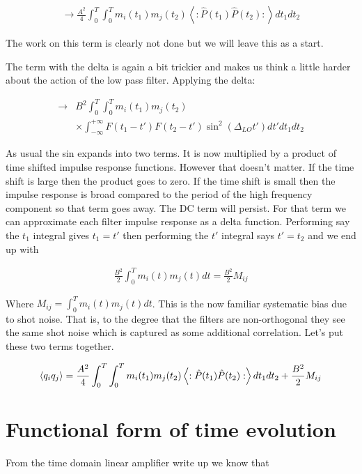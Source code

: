 \documentclass[12pt]{article}
\begin{document}
\begin{align}
\rightarrow \frac{A^2}{4}\int_0^T\int_0^T m_i(t_1) m_j(t_2)\left<:\hat{P}(t_1)\hat{P}(t_2):\right> dt_1 dt_2
\end{align}

The work on this term is clearly not done but we will leave this as a start.

The term with the delta is again a bit trickier and makes us think a little harder about the action of the low pass filter. Applying the delta:

\begin{align}
\rightarrow &B^2 \int_0^T \int_0^T m_i(t_1)m_j(t_2)\\
&\times \int_{-\infty}^{+\infty}F(t_1-t')F(t_2-t')\sin^2(\Delta_{LO}t')dt'dt_1dt_2
\end{align}

As usual the sin expands into two terms. It is now multiplied by a product of time shifted impulse response functions. However that doesn't matter. If the time shift is large then the product goes to zero. If the time shift is small then the impulse response is broad compared to the period of the high frequency component so that term goes away. The DC term will persist. For that term we can approximate each filter impulse response as a delta function. Performing say the $t_1$ integral gives $t_1=t'$ then performing the $t'$ integral says $t'=t_2$ and we end up with

\begin{align}
\frac{B^2}{2}\int_0^T m_i(t)m_j(t) dt  = \frac{B^2}{2} M_{ij}
\end{align}

Where $M_{ij} = \int_0^T m_i(t) m_j(t) dt$. This is the now familiar systematic bias due to shot noise. That is, to the degree that the filters are non-orthogonal they see the same shot noise which is captured as some additional correlation. Let's put these two terms together.

\begin{align}
\braket{q_iq_j} = \frac{A^2}{4}\int_0^T\int_0^T m_i(t_1) m_j(t_2)\left<:\hat{P}(t_1)\hat{P}(t_2):\right>dt_1dt_2 + \frac{B^2}{2} M_{ij}
\end{align}

\section{Functional form of time evolution}
From the time domain linear amplifier write up we know that
\end{document}
